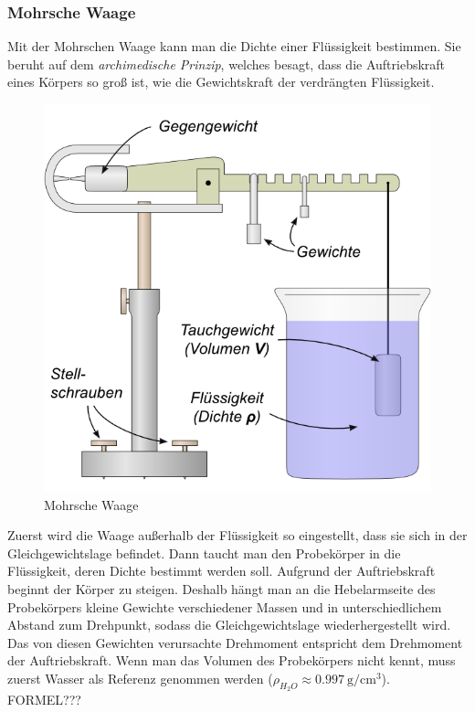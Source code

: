\documentclass[12pt,a4paper,titlepage,headinclude,bibtotoc]{scrartcl}
\begin{document}
\subsubsection{Mohrsche Waage}
Mit der Mohrschen Waage kann man die Dichte einer Flüssigkeit bestimmen.
Sie beruht auf dem \textit{archimedische Prinzip}, welches besagt, dass die Auftriebskraft eines Körpers so groß ist, wie die Gewichtskraft der verdrängten Flüssigkeit.\\
\begin{figure}[!htb]
	\centering
	\includegraphics[scale=0.7]{MohrscheWaage.png}
	\caption{Mohrsche Waage \cite{lp}}
	\label{fig:MohrscheWaage}
\end{figure}
Zuerst wird die Waage außerhalb der Flüssigkeit so eingestellt, dass sie sich in der Gleichgewichtslage befindet.
Dann taucht man den Probekörper in die Flüssigkeit, deren Dichte bestimmt werden soll.
Aufgrund der Auftriebskraft beginnt der Körper zu steigen.
Deshalb hängt man an die Hebelarmseite des Probekörpers kleine Gewichte verschiedener Massen und in unterschiedlichem Abstand zum Drehpunkt, sodass die Gleichgewichtslage wiederhergestellt wird.
Das von diesen Gewichten verursachte Drehmoment entspricht dem Drehmoment der Auftriebskraft.
Wenn man das Volumen des Probekörpers nicht kennt, muss zuerst Wasser als Referenz genommen werden ($\rho_{H_2O}\approx 0.997~ \si{\gram/\centi \meter ^3}$).\\
FORMEL???
\end{document}
